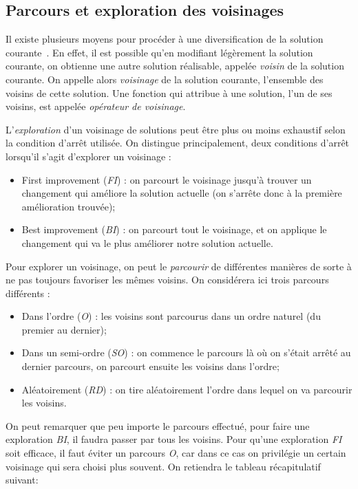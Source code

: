 \documentclass[a4paper,11pt]{article}%
\begin{document}
\subsection{Parcours et exploration des voisinages}
\label{voisinage}

Il existe plusieurs moyens pour procéder à une diversification de la solution courante~\cite{ME_2012}.
En effet, il est possible qu'en modifiant légèrement la solution courante, on obtienne une autre solution réalisable, appelée \emph{voisin} de la solution courante.
On appelle alors \emph{voisinage} de la solution courante, l'ensemble des voisins de cette solution.
Une fonction qui attribue à une solution, l'un de ses voisins, est appelée \emph{opérateur de voisinage}.

L'\emph{exploration} d'un voisinage de solutions peut être plus ou moins exhaustif selon la condition d'arrêt utilisée.
On distingue principalement, deux conditions d'arrêt lorsqu'il s'agit d'explorer un voisinage :

\begin{itemize}
\item First improvement (\emph{FI}) : on parcourt le voisinage jusqu'à trouver un changement qui améliore la solution actuelle (on s'arrête donc à la première amélioration trouvée);
\item Best improvement (\emph{BI}) : on parcourt tout le voisinage, et on applique le changement qui va le plus améliorer notre solution actuelle. 
\end{itemize}

Pour explorer un voisinage, on peut le \emph{parcourir} de différentes manières de sorte à ne pas toujours favoriser les mêmes voisins. On considérera ici trois parcours différents : 

\begin{itemize}
\item Dans l'ordre (\emph{O}) : les voisins sont parcourus dans un ordre naturel (du premier au dernier);
\item Dans un semi-ordre (\emph{SO}) : on commence le parcours là où on s'était arrêté au dernier parcours, on parcourt ensuite les voisins dans l'ordre;
\item Aléatoirement (\emph{RD}) : on tire aléatoirement l'ordre dans lequel on va parcourir les voisins. 
\end{itemize}

On peut remarquer que peu importe le parcours effectué, pour faire une exploration \emph{BI}, il faudra passer par tous les voisins. Pour qu'une exploration \emph{FI} soit efficace, il faut éviter un parcours \emph{O}, car dans ce cas on privilégie un certain voisinage qui sera choisi plus souvent. On retiendra le tableau récapitulatif suivant:
\end{document}
